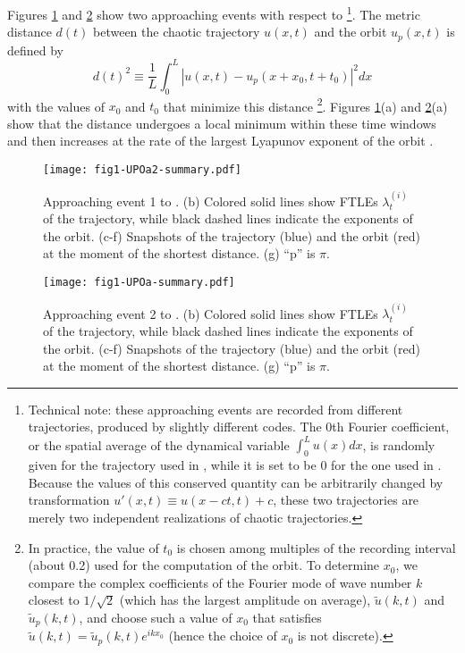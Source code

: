 Figures \ref{fig:UPOa2} and \ref{fig:UPOa}
show two approaching events with respect to 
\footnote{
  Technical note:
  these approaching events are recorded from different trajectories,
  produced by slightly different codes.
  The 0th Fourier coefficient,
  or the spatial average of the dynamical variable $\int_0^L u(x) dx$,
  is randomly given for the trajectory used in ,
  while it is set to be 0 for the one used in .
  Because the values of this conserved quantity can be arbitrarily changed
  by transformation $u'(x,t) \equiv u(x-ct,t)+c$,
  these two trajectories are merely two independent realizations
  of chaotic trajectories.
}.
The metric distance $d(t)$ between the chaotic trajectory $u(x,t)$
and the orbit $u_p(x,t)$ is defined by
\begin{equation}
  d(t)^2 \equiv \frac{1}{L}\int_0^L |u(x,t) - u_p(x+x_0, t+t_0)|^2 dx
  \label{eq:MetricDistance}
\end{equation}
with the values of $x_0$ and $t_0$ that minimize this distance
\footnote{
  In practice, the value of $t_0$ is chosen
  among multiples of the recording interval (about 0.2)
  used for the computation of the orbit.
  To determine $x_0$, we compare the complex coefficients
  of the Fourier mode of wave number $k$ closest to $1/\sqrt{2}$
  (which has the largest amplitude on average),
  $\tilde{u}(k,t)$ and $\tilde{u}_p(k,t)$,
  and choose such a value of $x_0$ that satisfies
  $\tilde{u}(k,t) = \tilde{u}_p(k,t) e^{ikx_0}$
  (hence the choice of $x_0$ is not discrete).
}.
Figures \ref{fig:UPOa2}(a) and \ref{fig:UPOa}(a) show
that the distance undergoes a local minimum within these time windows
and then increases at the rate of the largest Lyapunov exponent
of the orbit .
\begin{figure}[p]
  \centering
  \texttt{[image: fig1-UPOa2-summary.pdf]}
  \caption{Approaching event 1 to . (b) Colored solid lines show FTLEs $\lambda_t^{(i)}$ of the trajectory, while black dashed lines indicate the exponents of the orbit. (c-f) Snapshots of the trajectory (blue) and the orbit (red) at the moment of the shortest distance. (g) ``p'' is $\pi$.}
  \label{fig:UPOa2}
\end{figure}%
\begin{figure}[p]
  \centering
  \texttt{[image: fig1-UPOa-summary.pdf]}
  \caption{Approaching event 2 to . (b) Colored solid lines show FTLEs $\lambda_t^{(i)}$ of the trajectory, while black dashed lines indicate the exponents of the orbit. (c-f) Snapshots of the trajectory (blue) and the orbit (red) at the moment of the shortest distance. (g) ``p'' is $\pi$.}
  \label{fig:UPOa}
\end{figure}%
